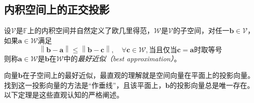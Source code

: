 \documentclass[main.tex]{subfiles}
\begin{document}
\subsection{内积空间上的正交投影}
\begin{definition}[最好近似]\label{def:A.4}
    设$\mathcal{V}$是$\mathbb{F}$上的内积空间并自然定义了欧几里得范，$\mathcal{W}$是$\mathcal{V}$的子空间，对任一$\mathbf{b}\in\mathcal{V}$，如果$\mathbf{a}\in\mathcal{W}$满足
    \[\left\|\mathbf{b}-\mathbf{a}\right\|\leq\left\|\mathbf{b}-\mathbf{c}\right\|,\quad\forall\mathbf{c}\in\mathcal{W},\text{当且仅当$\mathbf{c}=\mathbf{a}$时取等号}\]
    则称$\mathbf{a}\in\mathcal{W}$是$\mathbf{b}$在$\mathcal{W}$中的\emph{最好近似（best approximation）}。
\end{definition}

向量$\mathbf{b}$在子空间上的最好近似，最直观的理解就是空间向量在平面上的投影向量。找到这一投影向量的方法是“作垂线”，且该平面上，$\mathbf{b}$的投影向量总是唯一存在。以下定理是这些直观认知的严格阐述。
\end{document}
